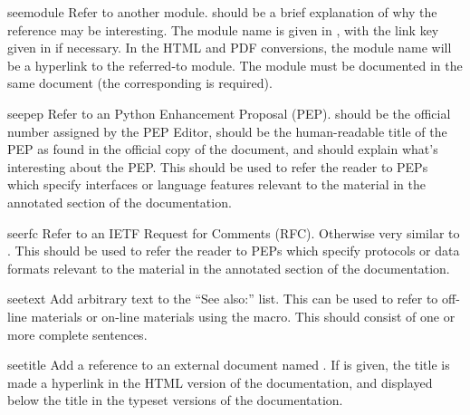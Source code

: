 \documentclass{howto}
\begin{document}
    \begin{macrodesc}{seemodule}{}
      Refer to another module.   should be a brief
      explanation of why the reference may be interesting.  The module
      name is given in , with the link key given in
       if necessary.  In the HTML and PDF conversions, the
      module name will be a hyperlink to the referred-to module.
        The module must be documented in the same
      document (the corresponding  is required).
    \end{macrodesc}

    \begin{macrodesc}{seepep}{}
      Refer to an Python Enhancement Proposal (PEP).  
      should be the official number assigned by the PEP Editor,
       should be the human-readable title of the PEP as
      found in the official copy of the document, and  should
      explain what's interesting about the PEP.  This should be used
      to refer the reader to PEPs which specify interfaces or language
      features relevant to the material in the annotated section of the
      documentation.
    \end{macrodesc}

    \begin{macrodesc}{seerfc}{}
      Refer to an IETF Request for Comments (RFC).  Otherwise very
      similar to .  This should be used
      to refer the reader to PEPs which specify protocols or data
      formats relevant to the material in the annotated section of the
      documentation.
    \end{macrodesc}

    \begin{macrodesc}{seetext}{}
      Add arbitrary text  to the ``See also:'' list.  This
      can be used to refer to off-line materials or on-line materials
      using the  macro.  This should consist of one or more
      complete sentences.
    \end{macrodesc}

    \begin{macrodesc}{seetitle}{}
      Add a reference to an external document named .  If
       is given, the title is made a hyperlink in the HTML
      version of the documentation, and displayed below the title in
      the typeset versions of the documentation.
    \end{macrodesc}
\end{document}
